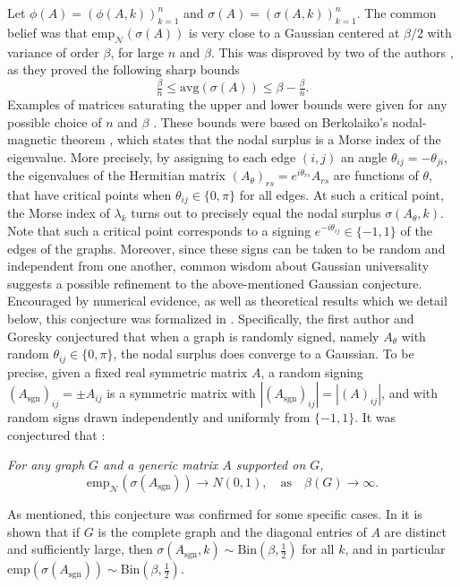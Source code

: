 \documentclass[reqno]{amsart}
\numberwithin{equation}{section}
\newcommand{\av}{\mathrm{avg}}
\newcommand{\emp}{\mathrm{emp}}
\newcommand{\Nemp}{\mathrm{emp}_{\mathcal{N}}}
\begin{document}
Let $\phi(A)=(\phi(A,k))_{k=1}^n$ and $\sigma(A) = (\sigma(A,k))_{k=1}^n$. The common belief was that $\emp_{\mathcal{N}}(\sigma(A))$ is very close to a Gaussian centered at $\beta/2$ with variance of order $\beta$, for large $n$ and $\beta$. This was disproved by two of the authors \cite{alon2024average}, as they proved the following sharp bounds 
\[\tfrac{\beta}{n}\le\av(\sigma(A))\le \beta -\tfrac{\beta}{n}.\]
Examples of matrices saturating the upper and lower bounds were given for any possible choice of $n$ and $\beta$ \cite{alon2024average}. These bounds were based on Berkolaiko's nodal-magnetic theorem \cite{berkolaiko2013nodal,colin2013magnetic}, which states that the nodal surplus is a Morse index of the eigenvalue. More precisely, by assigning to each edge $(i,j)$ an angle $\theta_{ij}=-\theta_{ji}$, the eigenvalues of the Hermitian matrix $(A_{\theta})_{rs}=e^{i\theta_{rs}}A_{rs}$ are functions of $\theta$, that have critical points when $\theta_{ij}\in\{0,\pi\}$ for all edges. At such a critical point, the Morse index of $\lambda_{k}$ turns out to precisely equal the nodal surplus $\sigma(A_{\theta},k)$. Note that such a critical point corresponds to a signing $e^{-i\theta_{ij}} \in \{-1,1\}$ of the edges of the graphs. Moreover, since these signs can be taken to be random and independent from one another, common wisdom about Gaussian universality suggests a possible refinement to the above-mentioned Gaussian conjecture. 
Encouraged by numerical evidence, as well as theoretical results which we detail below, this conjecture was formalized in \cite{alon2023morse}. Specifically, the first author and Goresky conjectured that when a graph is randomly signed, namely $A_{\theta}$ with random $\theta_{ij}\in\{0,\pi\}$, the nodal surplus does converge to a Gaussian.
To be precise, given a fixed real symmetric matrix $A$, a random signing $(A_{\mathrm{sgn}})_{ij}=\pm A_{ij}$ is a symmetric matrix with $|(A_{\mathrm{sgn}})_{ij}| = |(A)_{ij}|$, and with random signs drawn independently and uniformly from $\{-1,1\}$. 
It was conjectured that \cite[p.3]{alon2023morse}:
\begin{center}
    \emph{For any graph $G$ and a generic matrix $A$ supported on $G$,
\begin{equation}\label{conj}
  \Nemp(\sigma(A_{\mathrm{sgn}}))\to N(0,1), \quad\text{as}\quad \beta(G)\to\infty.  
\end{equation}}
\end{center}
As mentioned, this conjecture was confirmed for some specific cases. In \cite{alon2023morse} it is shown that if $G$ is the complete graph and the diagonal entries of $A$ are distinct and sufficiently large, then $\sigma(A_{\mathrm{sgn}},k)\sim \mathrm{Bin}(\beta,\tfrac{1}{2})$ for all $k$, and in particular $\emp(\sigma(A_{\mathrm{sgn}}))\sim \mathrm{Bin}(\beta,\tfrac{1}{2})$. 
\end{document}
